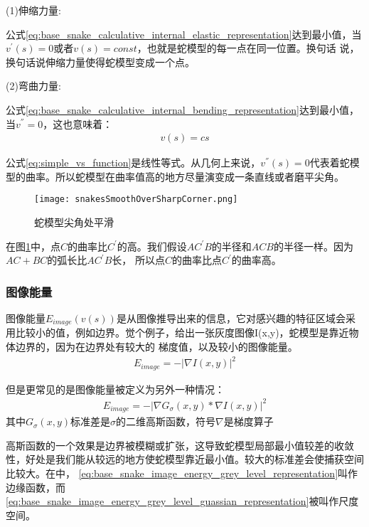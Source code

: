 (1)伸缩力量:

公式\eqref{eq:base_snake_calculative_internal_elastic_representation}达到最小值，当$v^{'}(s)=0$或者$v(s)=const$，也就是蛇模型的每一点在同一位置。换句话
说，换句话说伸缩力量使得蛇模型变成一个点。

(2)弯曲力量:

公式\eqref{eq:base_snake_calculative_internal_bending_representation}达到最小值，当$v^{''}=0$，这也意味着：
\begin{align}\label{eq:simple_vs_function}
	v(s) = cs
\end{align}

公式\eqref{eq:simple_vs_function}是线性等式。从几何上来说，$v^{''}(s)=0$代表着蛇模型的曲率。所以蛇模型在曲率值高的地方尽量演变成一条直线或者磨平尖角。

\begin{figure}[htbp]
	\centering
	\texttt{[image: snakesSmoothOverSharpCorner.png]}
	\caption{蛇模型尖角处平滑}\label{fig:snakesSmoothOverSharpCorner}
\end{figure}

在图\ref{fig:snakesSmoothOverSharpCorner}中，点$C$的曲率比$C^{'}$的高。我们假设$AC^{'}B$的半径和$ACB$的半径一样。因为$AC+BC$的弧长比$AC^{'}B$长，
所以点$C$的曲率比点$C^{'}$的曲率高。

\subsubsection{图像能量}
图像能量$E_{image}(v(s))$是从图像推导出来的信息，它对感兴趣的特征区域会采用比较小的值，例如边界。觉个例子，给出一张灰度图像I(x,y)，蛇模型是靠近物体边界的，因为在边界处有较大的
梯度值，以及较小的图像能量。
\begin{align}\label{eq:base_snake_image_energy_grey_level_representation}
	E_{image} = -|\nabla I(x,y)|^{2}
\end{align}

但是更常见的是图像能量被定义为另外一种情况：
\begin{align}\label{eq:base_snake_image_energy_grey_level_guassian_representation}
E_{image} = -|\nabla G_{\sigma}(x,y) *  \nabla I(x,y)|^{2}
\end{align}
其中$G_{\sigma}(x,y)$标准差是$\sigma$的二维高斯函数，符号$\nabla$是梯度算子

高斯函数的一个效果是边界被模糊或扩张，这导致蛇模型局部最小值较差的收敛性，好处是我们能从较远的地方使蛇模型靠近最小值。较大的标准差会使捕获空间比较大。在\cite{kass1988snakes}中，
\eqref{eq:base_snake_image_energy_grey_level_representation}叫作边缘函数，而\eqref{eq:base_snake_image_energy_grey_level_guassian_representation}被叫作尺度空间。

